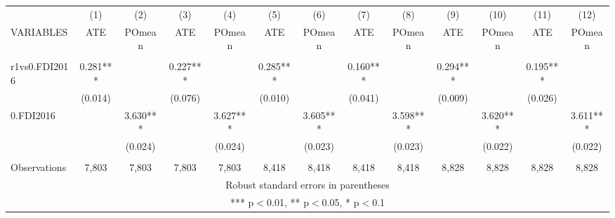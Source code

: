 \documentclass[]{article}
\begin{document}
\begin{tabular}{lcccccccccccc} \hline
 & (1) & (2) & (3) & (4) & (5) & (6) & (7) & (8) & (9) & (10) & (11) & (12) \\
VARIABLES & ATE & POmean & ATE & POmean & ATE & POmean & ATE & POmean & ATE & POmean & ATE & POmean \\ \hline
 &  &  &  &  &  &  &  &  &  &  &  &  \\
r1vs0.FDI2016 & 0.281*** &  & 0.227*** &  & 0.285*** &  & 0.160*** &  & 0.294*** &  & 0.195*** &  \\
 & (0.014) &  & (0.076) &  & (0.010) &  & (0.041) &  & (0.009) &  & (0.026) &  \\
0.FDI2016 &  & 3.630*** &  & 3.627*** &  & 3.605*** &  & 3.598*** &  & 3.620*** &  & 3.611*** \\
 &  & (0.024) &  & (0.024) &  & (0.023) &  & (0.023) &  & (0.022) &  & (0.022) \\
 &  &  &  &  &  &  &  &  &  &  &  &  \\
 Observations & 7,803 & 7,803 & 7,803 & 7,803 & 8,418 & 8,418 & 8,418 & 8,418 & 8,828 & 8,828 & 8,828 & 8,828 \\ \hline
\multicolumn{13}{c}{ Robust standard errors in parentheses} \\
\multicolumn{13}{c}{ *** p$<$0.01, ** p$<$0.05, * p$<$0.1} \\
\end{tabular}
\end{document}
